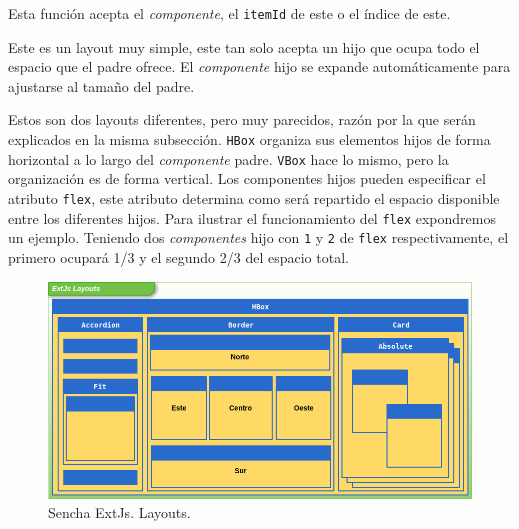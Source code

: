 \begin{description}[style=unboxed,leftmargin=0cm,labelwidth=1cm]
			  Esta función acepta el \emph{componente}, el \texttt{itemId} de este o el índice de este.
			\item[\texttt{Fit}] Este es un layout muy simple, este tan solo acepta un hijo que ocupa todo el espacio que el padre ofrece.
			  El \emph{componente} hijo se expande automáticamente para ajustarse al tamaño del padre.
			\item[\texttt{HBox y VBox}] Estos son dos layouts diferentes, pero muy parecidos, razón por la que serán explicados en la
			  misma subsección. \texttt{HBox} organiza sus elementos hijos de forma horizontal a lo largo del \emph{componente} padre.
			  \texttt{VBox} hace lo mismo, pero la organización es de forma vertical. Los componentes hijos pueden especificar el atributo
			  \texttt{flex}, este atributo determina como será repartido el espacio disponible entre los diferentes hijos. Para ilustrar
			  el funcionamiento del \texttt{flex} expondremos un ejemplo. Teniendo dos \emph{componentes} hijo con \texttt{1} y \texttt{2}
			  de \texttt{flex} respectivamente, el primero ocupará 1/3 y el segundo 2/3 del espacio total.
		\end{description}
		\begin{figure}[h]
			\centering
			\includegraphics[keepaspectratio, width=1\textwidth]{./img/layouts.png}
			\caption{Sencha ExtJs. Layouts.}   
			\label{fig:layouts}
		\end{figure}

